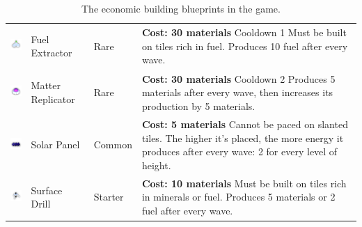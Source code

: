 \begin{table}[H]
\begin{tabular}{m{15mm}m{20mm}lm{}}
        \includegraphics[height=15mm]{img/Icons/Buildings/Fuel Refinery.png}     & Fuel \newline Extractor & Rare            &
        \footnotesize{\textbf{Cost: 30 materials} \newline Cooldown 1 \newline Must be built on tiles rich in fuel. \newline Produces 10 fuel after every wave.}                                                                \\

        \includegraphics[height=15mm]{img/Icons/Buildings/Matter Replicator.png} & Matter Replicator       & Rare            &
        \footnotesize{\textbf{Cost: 30 materials} \newline Cooldown 2 \newline Produces 5 materials after every wave, then increases its production by 5 materials.}                                                            \\

        \includegraphics[height=15mm]{img/Icons/Buildings/Solar Panel.png}       & Solar Panel             & Common          &
        \footnotesize{\textbf{Cost: 5 materials} \newline Cannot be paced on slanted tiles. \newline The higher it's placed, the more energy it produces after every wave: 2 for every level of height.}                        \\

        \includegraphics[height=15mm]{img/Icons/Buildings/Surface Drill.png}     & Surface Drill           & Starter         &
        \footnotesize{\textbf{Cost: 10 materials} \newline Must be built on tiles rich in minerals or fuel. \newline Produces 5 materials or 2 fuel after every wave.}                                                          \\
        \bottomrule
    \end{tabular}
    \caption{The economic building blueprints in the game.}
    \label{tab:economic-buildings}
\end{table}


